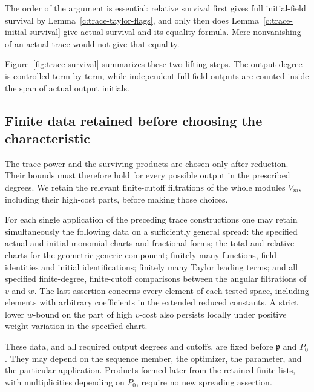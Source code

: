 The order of the argument is essential: relative survival first gives
full initial-field survival by Lemma~\ref{c:trace-taylor-flags}, and only
then does Lemma~\ref{c:trace-initial-survival} give actual survival and
its equality formula.  Mere nonvanishing of an actual trace would not
give that equality.

Figure~\ref{fig:trace-survival} summarizes these two lifting steps. The
output degree is controlled term by term, while independent full-field
outputs are counted inside the span of actual output initials.


\subsection{Finite data retained before choosing the characteristic}

The trace power and the surviving products are chosen only after
reduction.  Their bounds must therefore hold for every possible output
in the prescribed degrees.  We retain the relevant finite-cutoff
filtrations of the whole modules $V_m$, including their high-cost
parts, before making those choices.

\begin{lemma}\label{c:trace-finite-data}
For each single application of the preceding trace constructions one may
retain simultaneously the following data on a sufficiently general spread:
the specified actual and initial monomial charts and fractional forms;
the total and relative charts for the geometric generic component;
finitely many functions, field identities and initial identifications;
finitely many Taylor leading terms; and all specified finite-degree,
finite-cutoff comparisons between the angular filtrations of $v$ and $w$.
The last assertion concerns every element of each tested space, including
elements with arbitrary coefficients in the extended reduced constants.
A strict lower $w$-bound on the part of high $v$-cost also persists locally
under positive weight variation in the specified chart.

These data, and all required output degrees and cutoffs, are fixed before
$\mathfrak p$ and $P_0$.  They may depend on the sequence member, the optimizer,
the parameter, and the particular application.  Products formed later
from the retained finite lists, with multiplicities depending on $P_0$,
require no new spreading assertion.
\end{lemma}

